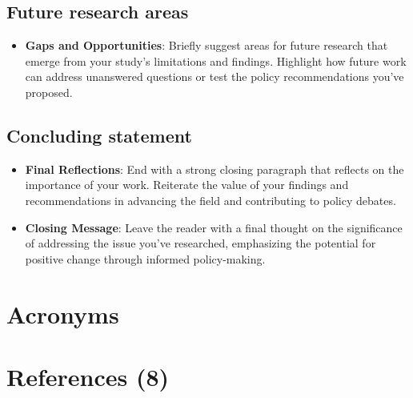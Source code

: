 \documentclass[
  12pt,
]{article}
\providecommand{\tightlist}{%
  \setlength{\itemsep}{0pt}\setlength{\parskip}{0pt}}\usepackage{longtable,booktabs,array}
\begin{document}
\subsection{Future research areas}\label{future-research-areas}

\begin{itemize}
\tightlist
\item
  \textbf{Gaps and Opportunities}: Briefly suggest areas for future
  research that emerge from your study's limitations and findings.
  Highlight how future work can address unanswered questions or test the
  policy recommendations you've proposed.
\end{itemize}

\subsection{Concluding statement}\label{concluding-statement}

\begin{itemize}
\item
  \textbf{Final Reflections}: End with a strong closing paragraph that
  reflects on the importance of your work. Reiterate the value of your
  findings and recommendations in advancing the field and contributing
  to policy debates.
\item
  \textbf{Closing Message}: Leave the reader with a final thought on the
  significance of addressing the issue you've researched, emphasizing
  the potential for positive change through informed policy-making.
\end{itemize}

\section{Acronyms}\label{acronyms}

\section*{References (8)}\label{references-8}
\end{document}
